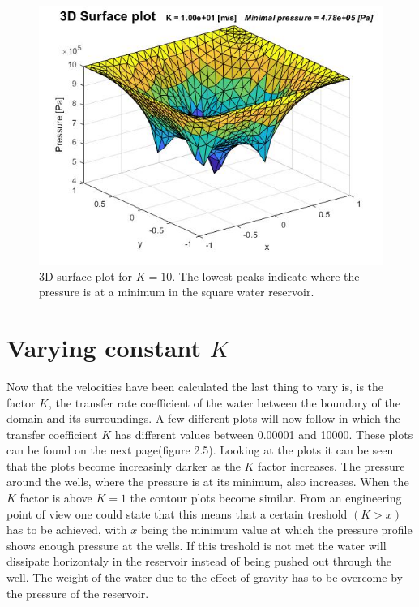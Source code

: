 \documentclass[a4paper]{report}
\begin{document}
\begin{figure}
	\centering
	\includegraphics[width=130mm]{3Dvk10.jpg}
	\caption{3D surface plot for $K=10$. The lowest peaks indicate where the pressure is at a minimum in the square water reservoir.
	\label{overflow}}
\end{figure}


\newpage
\section{Varying constant $K$}

Now that the velocities have been calculated the last thing to vary is, is the factor $K$, the transfer rate coefficient of the water between the boundary of the domain and its surroundings. A few different plots will now follow in which the transfer coefficient $K$ has different values between 0.00001 and 10000. These plots can be found on the next page(figure 2.5). Looking at the plots it can be seen that the plots become increasinly darker as the $K$ factor increases. The pressure around the wells, where the pressure is at its minimum, also increases. When the $K$ factor is above $K=1$ the contour plots become similar. From an engineering point of view one could state that this means that a certain treshold $(K>x)$ has to be achieved, with $x$ being the minimum value at which the pressure profile shows enough pressure at the wells. If this treshold is not met the water will dissipate horizontaly in the reservoir instead of being pushed out through the well. The weight of the water due to the effect of gravity has to be overcome by the pressure of the reservoir.\\
\end{document}
